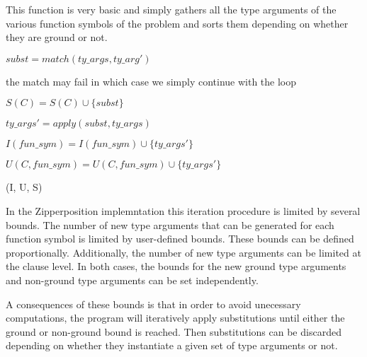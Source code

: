 \documentclass[]{ceurart}
\begin{document}
This function is very basic and simply gathers all the type arguments of the various function symbols of the problem and sorts them depending on whether they are ground or not.


\begin{algorithm}[tbh]
\begin{algorithmic}[1]
            
            \State \(subst = match(ty\_args, ty\_arg')\)

            \State \Comment the match may fail in which case we simply continue with the loop

            \State \(S(C) = S(C) \cup \{subst\}\)
         \EndFor
      \EndFor
   
   \EndFor

            \State \(ty\_args' = apply(subst, ty\_args)\)


               \State \(I(fun\_sym) = I(fun\_sym) \cup \{ty\_args'\}\)
            \Else

               \State \(U(C, fun\_sym) = U(C, fun\_sym) \cup \{ty\_args'\}\)
            \EndIf

         \EndFor
      \EndFor
   \EndFor

   \State \Return (I, U, S)

\EndFunction
\end{algorithmic}
\end{algorithm}
In the Zipperposition implemntation this iteration procedure is limited by several bounds. The number of new type arguments that can be generated for each function symbol is limited by user-defined bounds. These bounds can be defined proportionally. Additionally, the number of new type arguments can be limited at the clause level. In both cases, the bounds for the new ground type arguments and non-ground type arguments can be set independently.

A consequences of these bounds is that in order to avoid unecessary computations, the program will iteratively apply substitutions until either the ground or non-ground bound is reached. Then substitutions can be discarded depending on whether they instantiate a given set of type arguments or not.
\end{document}
